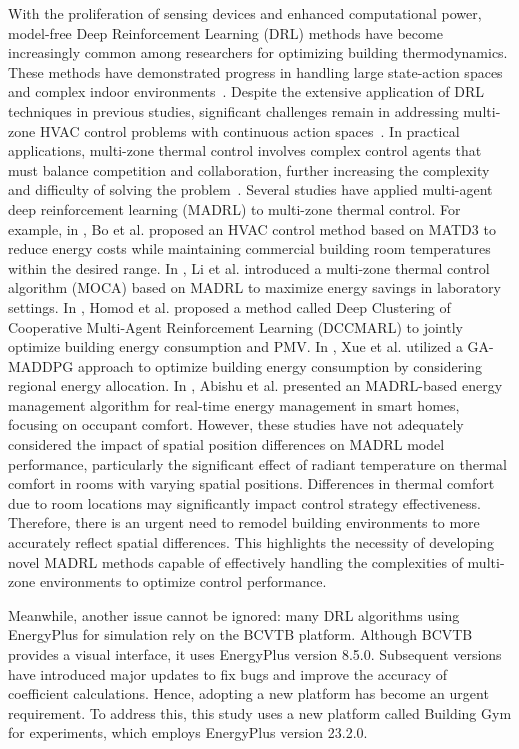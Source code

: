 \documentclass[preprint,12pt]{elsarticle}
\begin{document}
With the proliferation of sensing devices and enhanced computational power, model-free Deep Reinforcement Learning (DRL) 
methods have become increasingly common among researchers for optimizing building thermodynamics. These methods 
have demonstrated progress in handling large state-action spaces~\cite{ref10, ref11} and complex indoor environments~\cite{ref12, ref13, ref14}. 
Despite the extensive application of DRL techniques in previous studies, significant challenges remain in addressing 
multi-zone HVAC control problems with continuous action spaces~\cite{ref15}. In practical applications, multi-zone thermal 
control involves complex control agents that must balance competition and collaboration, further increasing the 
complexity and difficulty of solving the problem~\cite{ref16}. Several studies have applied multi-agent deep reinforcement 
learning (MADRL) to multi-zone thermal control. For example, in \cite{ref17}, Bo et al. proposed 
an HVAC control method based on MATD3 to reduce energy costs while maintaining commercial building room 
temperatures within the desired range. In \cite{ref18}, Li et al. introduced a multi-zone thermal 
control algorithm (MOCA) based on MADRL to maximize energy savings in laboratory settings. In \cite{ref19}, 
Homod et al. proposed a method called Deep Clustering of Cooperative Multi-Agent Reinforcement Learning (DCCMARL) to 
jointly optimize building energy consumption and PMV. In \cite{ref20}, Xue et al. utilized a GA-MADDPG 
approach to optimize building energy consumption by considering regional energy allocation. In \cite{ref21}, 
Abishu et al. presented an MADRL-based energy management algorithm for real-time energy management in smart homes, 
focusing on occupant comfort.
However, these studies have not adequately considered the impact 
of spatial position differences on MADRL model performance, particularly the significant effect of radiant temperature 
on thermal comfort in rooms with varying spatial positions. Differences in thermal comfort due to room 
locations may significantly impact control strategy effectiveness. Therefore, there is an urgent need to 
remodel building environments to more accurately reflect spatial differences. This highlights the necessity 
of developing novel MADRL methods capable of effectively handling the complexities of multi-zone environments 
to optimize control performance.

Meanwhile, another issue cannot be ignored: many DRL algorithms using EnergyPlus for simulation rely on the 
BCVTB platform. Although BCVTB provides a visual interface, it uses EnergyPlus version 8.5.0. Subsequent versions 
have introduced major updates to fix bugs and improve the accuracy of coefficient calculations. Hence, adopting a 
new platform has become an urgent requirement. To address this, this study uses a new platform called Building Gym 
for experiments, which employs EnergyPlus version 23.2.0.
\end{document}

